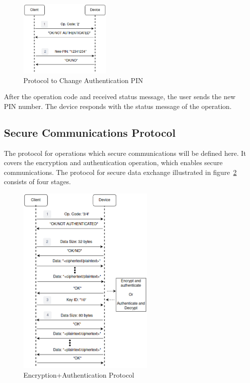 \begin{figure}[h!]
	\centering
	\includegraphics[width=0.4\textwidth]{./Images/change-PIN.png}
	\caption{Protocol to Change Authentication PIN}
	\label{fig:protocol:change-PIN}
\end{figure}

After the operation code and received status message, the user sends the new \ac{PIN} number. The device responds with the status message of the operation.

\subsection{Secure Communications Protocol}\label{chap:implementation:protocol:comms}

The protocol for operations which secure communications will be defined here. It covers the encryption and authentication operation, which enables secure communications.%
The protocol for secure data exchange illustrated in figure~\ref{fig:protocol:data-exchange} consists of four stages.

\begin{figure}[h!]
	\centering
	\includegraphics[width=0.6\textwidth]{./Images/data-exchange.png}
	\caption{Encryption+Authentication Protocol}
	\label{fig:protocol:data-exchange}
\end{figure}

